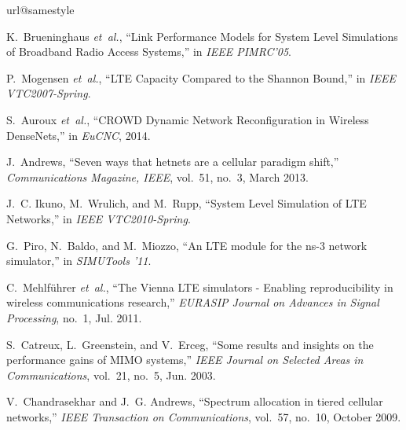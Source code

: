 \documentclass[conference]{IEEEtran}
\begin{document}
\begin{thebibliography}{10}
\providecommand{\url}[1]{#1}
\csname url@samestyle\endcsname
\providecommand{\newblock}{\relax}
\providecommand{\bibinfo}[2]{#2}
\providecommand{\BIBentrySTDinterwordspacing}{\spaceskip=0pt\relax}
\providecommand{\BIBentryALTinterwordstretchfactor}{4}
\providecommand{\BIBentryALTinterwordspacing}{\spaceskip=\fontdimen2\font plus
\BIBentryALTinterwordstretchfactor\fontdimen3\font minus
  \fontdimen4\font\relax}
\providecommand{\BIBforeignlanguage}[2]{{\expandafter\ifx\csname l@#1\endcsname\relax
\typeout{** WARNING: IEEEtran.bst: No hyphenation pattern has been}\typeout{** loaded for the language `#1'. Using the pattern for}\typeout{** the default language instead.}\else
\language=\csname l@#1\endcsname
\fi
#2}}
\providecommand{\BIBdecl}{\relax}
\BIBdecl

K.~Brueninghaus \emph{et~al.}, ``{Link Performance Models for System Level
  Simulations of Broadband Radio Access Systems},'' in \emph{IEEE PIMRC'05}.

P.~Mogensen \emph{et~al.}, ``{LTE Capacity Compared to the Shannon Bound},'' in
  \emph{IEEE VTC2007-Spring}.

S.~Auroux \emph{et~al.}, ``{CROWD Dynamic Network Reconfiguration in Wireless
  DenseNets},'' in \emph{EuCNC}, 2014.

J.~Andrews, ``Seven ways that hetnets are a cellular paradigm shift,''
  \emph{Communications Magazine, IEEE}, vol.~51, no.~3, March 2013.

J.~C. Ikuno, M.~Wrulich, and M.~Rupp, ``{System Level Simulation of LTE
  Networks},'' in \emph{IEEE VTC2010-Spring}.

G.~Piro, N.~Baldo, and M.~Miozzo, ``{An LTE module for the ns-3 network
  simulator},'' in \emph{SIMUTools '11}.

C.~Mehlf\"{u}hrer \emph{et~al.}, ``{The Vienna LTE simulators - Enabling
  reproducibility in wireless communications research},'' \emph{EURASIP Journal
  on Advances in Signal Processing}, no.~1, Jul. 2011.

S.~Catreux, L.~Greenstein, and V.~Erceg, ``{Some results and insights on the
  performance gains of MIMO systems},'' \emph{IEEE Journal on Selected Areas in
  Communications}, vol.~21, no.~5, Jun. 2003.

V.~Chandrasekhar and J.~G. Andrews, ``Spectrum allocation in tiered cellular
  networks,'' \emph{IEEE Transaction on Communications}, vol.~57, no.~10,
  October 2009.


\end{thebibliography}
\end{document}

